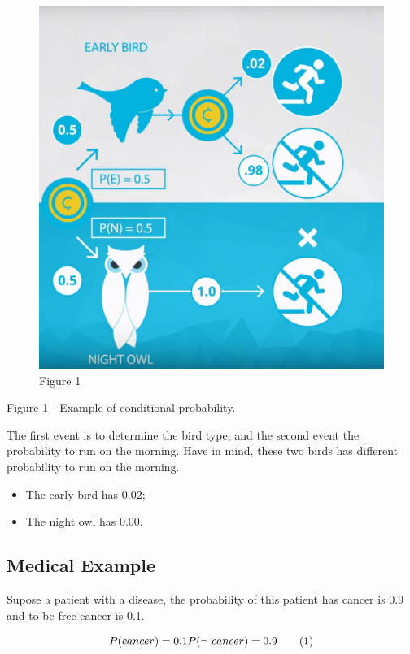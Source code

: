 \documentclass[]{book}
\providecommand{\tightlist}{%
  \setlength{\itemsep}{0pt}\setlength{\parskip}{0pt}}
\begin{document}
\begin{figure}
\centering
\includegraphics{01-img/c4_l6_01.png}
\caption{Figure 1}
\end{figure}

Figure 1 - Example of conditional probability.

The first event is to determine the bird type, and the second event the
probability to run on the morning. Have in mind, these two birds has
different probability to run on the morning.

\begin{itemize}
\tightlist
\item
  The early bird has 0.02;
\item
  The night owl has 0.00.
\end{itemize}

\subsection{Medical Example}\label{medical-example-1}

Supose a patient with a disease, the probability of this patient has
cancer is 0.9 and to be free cancer is 0.1.

\[P(cancer) = 0.1 \\
  P(\neg \ cancer) = 0.9 \tag{1}\]
\end{document}
